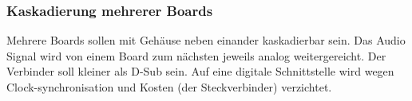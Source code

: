 \subsubsection{Kaskadierung mehrerer Boards}
\label{sec:Konzept_Kaskadierung}

Mehrere Boards sollen mit Gehäuse neben einander kaskadierbar sein. Das Audio Signal wird von einem Board zum nächsten jeweils analog weitergereicht. Der Verbinder soll kleiner als D-Sub sein. Auf eine digitale Schnittstelle wird wegen Clock-synchronisation und Kosten (der Steckverbinder) verzichtet.


